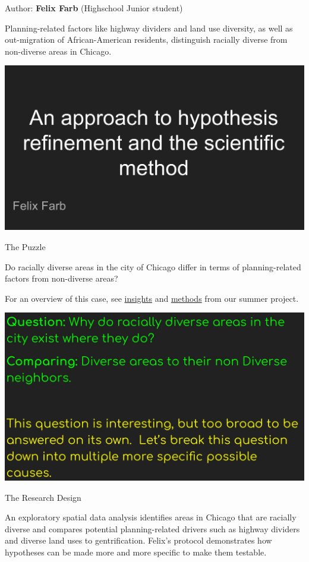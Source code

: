 \documentclass[
]{book}
\begin{document}
Author: \textbf{Felix Farb} (Highschool Junior student)

Planning-related factors like highway dividers and land use diversity, as well as out-migration of African-American residents, distinguish racially diverse from non-diverse areas in Chicago.

\includegraphics{images/racialdiversity1.png}

The Puzzle

Do racially diverse areas in the city of Chicago differ in terms of planning-related factors from non-diverse areas?

For an overview of this case, see \href{https://uchicago.box.com/s/pdku4e9rszvhtfnl1mv9o6sdv0ul1j3b}{insights} and \href{https://uchicago.box.com/s/rllzauyb3ew80htdq92i38o0re3q34v0}{methods} from our summer project.

\includegraphics{images/racialdiversity2.jpg}

The Research Design

An exploratory spatial data analysis identifies areas in Chicago that are racially diverse and compares potential planning-related drivers such as highway dividers and diverse land uses to gentrification. Felix's protocol demonstrates how hypotheses can be made more and more specific to make them testable.
\end{document}
